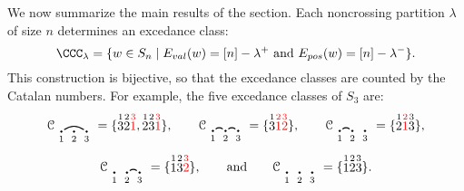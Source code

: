 \documentclass[submission]{FPSAC2024}
\theoremstyle{definition}
\theoremstyle{remark}
\numberwithin{equation}{section}
\renewcommand{\setminus}{-}
\newcommand{\EP}{E_{pos}}
\newcommand{\EV}{E_{val}}
\begin{document}
We now summarize the main results of the section.  
Each noncrossing partition $\lambda$ of size $n$ determines an excedance class: 
\[
\CCC_{\lambda} = \{ w \in S_{n} \;|\;  \text{$\EV(w) = [n] \setminus \lambda^{+}$ and $\EP(w) = [n] \setminus \lambda^{-}$}  \}.
\]
This construction is bijective, so that the excedance classes are counted by the Catalan numbers.  For example, the five excedance classes of $S_{3}$ are:
\[
\mathcal{C}_{\begin{tikzpicture}[scale = 0.35, baseline = 0.35*-0.2]
\foreach \x in {1, ..., 3}{\draw[fill] (\x - 1, 0) circle (2pt) node[inner sep = 2pt] (\x) {};}
\foreach \x in {1, ..., 3}{\node[below] at (\x) {$\scriptstyle \x$};}
\foreach \i\j in {1/3}{\draw[thick] (\i) to[out = 35, in = 145] (\j);}
\end{tikzpicture}} = \{ \stackrel{1}{3}  \stackrel{2}{2} \color{red} \stackrel{3}{1} \color{black}, \stackrel{1}{2}\stackrel{2}{3} \color{red} \stackrel{3}{1} \color{black} \}, \qquad
\mathcal{C}_{\begin{tikzpicture}[scale = 0.35, baseline = 0.35*-0.2]
\foreach \x in {1, ..., 3}{\draw[fill] (\x - 1, 0) circle (2pt) node[inner sep = 2pt] (\x) {};}
\foreach \x in {1, ..., 3}{\node[below] at (\x) {$\scriptstyle \x$};}
\foreach \i\j in {1/2, 2/3}{\draw[thick] (\i) to[out = 35, in = 145] (\j);}
\end{tikzpicture}} = \{ \stackrel{1}{3} \color{red} \stackrel{2}{1} \stackrel{3}{2}  \color{black} \}, \qquad
\mathcal{C}_{\begin{tikzpicture}[scale = 0.35, baseline = 0.35*-0.2]
\foreach \x in {1, ..., 3}{\draw[fill] (\x - 1, 0) circle (2pt) node[inner sep = 2pt] (\x) {};}
\foreach \x in {1, ..., 3}{\node[below] at (\x) {$\scriptstyle \x$};}
\foreach \i\j in {1/2}{\draw[thick] (\i) to[out = 35, in = 145] (\j);}
\end{tikzpicture}} = \{\stackrel{1}{2}  \color{red} \stackrel{2}{1} \color{black}  \stackrel{3}{3}\}, 
\]
\[
\mathcal{C}_{\begin{tikzpicture}[scale = 0.35, baseline = 0.35*-0.2]
\foreach \x in {1, ..., 3}{\draw[fill] (\x - 1, 0) circle (2pt) node[inner sep = 2pt] (\x) {};}
\foreach \x in {1, ..., 3}{\node[below] at (\x) {$\scriptstyle \x$};}
\foreach \i\j in {2/3}{\draw[thick] (\i) to[out = 35, in = 145] (\j);}
\end{tikzpicture}} = \{\stackrel{1}{1} \stackrel{2}{3}  \color{red} \stackrel{3}{2} \color{black} \}, \qquad\text{and}\qquad
\mathcal{C}_{\begin{tikzpicture}[scale = 0.35, baseline = 0.35*-0.2]
\foreach \x in {1, ..., 3}{\draw[fill] (\x - 1, 0) circle (2pt) node[inner sep = 2pt] (\x) {};}
\foreach \x in {1, ..., 3}{\node[below] at (\x) {$\scriptstyle \x$};}
\end{tikzpicture}} = \{\stackrel{1}{1} \stackrel{2}{2} \stackrel{3}{3} \}.
\]
\end{document}
